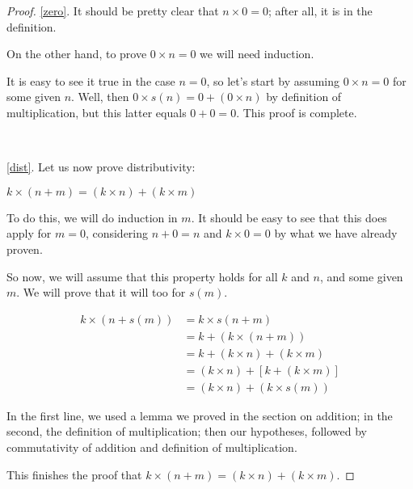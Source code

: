 \documentclass[12pt,a4paper]{article}
\theoremstyle{definition}
\theoremstyle{definition}
\theoremstyle{plain}
\theoremstyle{plain}
\begin{document}
	\begin{proof}
		\ref{zero}. It should be pretty clear that $n \times 0 = 0$; after all, it is in the definition.
			
		On the other hand, to prove $0 \times n = 0$ we will need induction.
			
		It is easy to see it true in the case $n = 0$, so let's start by assuming $0 \times n = 0$ for some given $n$. Well, then $0 \times s(n) = 0 + (0 \times n)$ by definition of multiplication, but this latter equals $0 + 0 = 0$. This proof is complete.
		
		~
		
		\ref{dist}. Let us now prove distributivity:
		
		$k \times (n + m) = (k \times n) + (k \times m)$
		
		To do this, we will do induction in $m$. It should be easy to see that this does apply for $m=0$, considering $n+0 = n$  and $k \times 0 = 0$ by what we have already proven.
		
		So now, we will assume that this property holds for all $k$ and $n$, and some given $m$. We will prove that it will too for $s(m)$.
		
		\begin{align*}
		k \times (n + s(m)) &= k \times s(n + m) \\
							&= k + (k \times (n + m)) \\
							&= k + (k \times n) + (k \times m) \\
							&= (k \times n) + [k + (k \times m)] \\
							&= (k \times n) + (k \times s(m))
		\end{align*}
		
		In the first line, we used a lemma we proved in the section on addition; in the second, the definition of multiplication; then our hypotheses, followed by commutativity of addition and definition of multiplication.
		
		This finishes the proof that $k \times (n+m) = (k \times n) + (k \times m)$.
		
	\end{proof}
	
	
	
\end{document}
